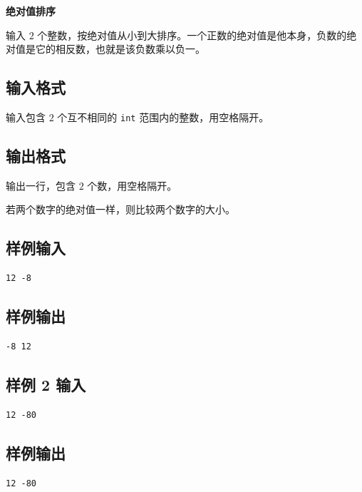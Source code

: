 \documentclass{article}
\newcommand{\problemname}[1]{\begin{center}\Large\bfseries #1\end{center}}
\begin{document}
\problemname{绝对值排序}

输入 $2$ 个整数，按绝对值从小到大排序。一个正数的绝对值是他本身，负数的绝对值是它的相反数，也就是该负数乘以负一。

\subsection*{输入格式}
输入包含 $2$ 个互不相同的 \texttt{int} 范围内的整数，用空格隔开。

\subsection*{输出格式}
输出一行，包含 $2$ 个数，用空格隔开。

若两个数字的绝对值一样，则比较两个数字的大小。

\subsection*{样例输入}
\begin{verbatim}
12 -8
\end{verbatim}

\subsection*{样例输出}
\begin{verbatim}
-8 12
\end{verbatim}

\subsection*{样例 2 输入}
\begin{verbatim}
12 -80
\end{verbatim}

\subsection*{样例输出}
\begin{verbatim}
12 -80
\end{verbatim}
\end{document}
